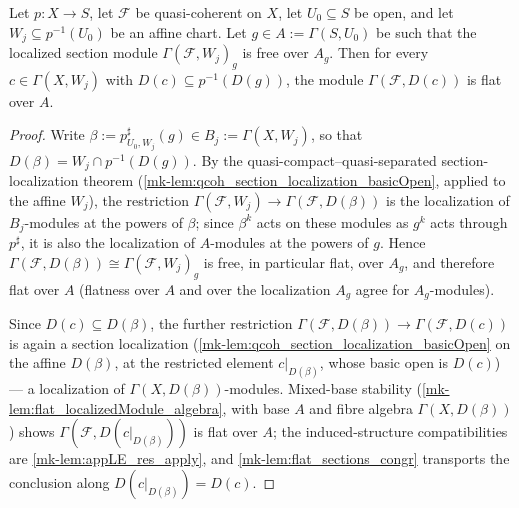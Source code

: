 \begin{lemma}
  \label{mk-lem:flat_section_chartBasic}
  \leanok

  Let \(p : X \to S\), let \(\mathcal F\) be quasi-coherent on \(X\), let
  \(U_0 \subseteq S\) be open, and let \(W_j \subseteq p^{-1}(U_0)\) be an
  affine chart. Let \(g \in A := \Gamma(S, U_0)\) be such that the localized
  section module \(\Gamma(\mathcal F, W_j)_g\) is free over \(A_g\). Then for
  every \(c \in \Gamma(X, W_j)\) with \(D(c) \subseteq p^{-1}(D(g))\), the
  module \(\Gamma(\mathcal F, D(c))\) is flat over \(A\).
\end{lemma}
\begin{proof}
  \leanok
  Write \(\beta := p^\sharp_{U_0, W_j}(g) \in B_j := \Gamma(X, W_j)\), so that
  \(D(\beta) = W_j \cap p^{-1}(D(g))\). By the quasi-compact--quasi-separated
  section-localization theorem
  (\ref{mk-lem:qcoh_section_localization_basicOpen}, applied to the affine
  \(W_j\)), the restriction
  \(\Gamma(\mathcal F, W_j) \to \Gamma(\mathcal F, D(\beta))\) is the
  localization of \(B_j\)-modules at the powers of \(\beta\); since
  \(\beta^k\) acts on these modules as \(g^k\) acts through \(p^\sharp\), it
  is also the localization of \(A\)-modules at the powers of \(g\). Hence
  \(\Gamma(\mathcal F, D(\beta)) \cong \Gamma(\mathcal F, W_j)_g\) is free,
  in particular flat, over \(A_g\), and therefore flat over \(A\) (flatness
  over \(A\) and over the localization \(A_g\) agree for
  \(A_g\)-modules).

  Since \(D(c) \subseteq D(\beta)\), the further restriction
  \(\Gamma(\mathcal F, D(\beta)) \to \Gamma(\mathcal F, D(c))\) is again a
  section localization (\ref{mk-lem:qcoh_section_localization_basicOpen} on the
  affine \(D(\beta)\), at the restricted element \(c|_{D(\beta)}\), whose
  basic open is \(D(c)\)) — a localization of
  \(\Gamma(X, D(\beta))\)-modules. Mixed-base stability
  (\ref{mk-lem:flat_localizedModule_algebra}, with base \(A\) and fibre algebra
  \(\Gamma(X, D(\beta))\)) shows \(\Gamma(\mathcal F, D(c|_{D(\beta)}))\) is
  flat over \(A\); the induced-structure compatibilities are
  \ref{mk-lem:appLE_res_apply}, and \ref{mk-lem:flat_sections_congr} transports
  the conclusion along \(D(c|_{D(\beta)}) = D(c)\).
\end{proof}

